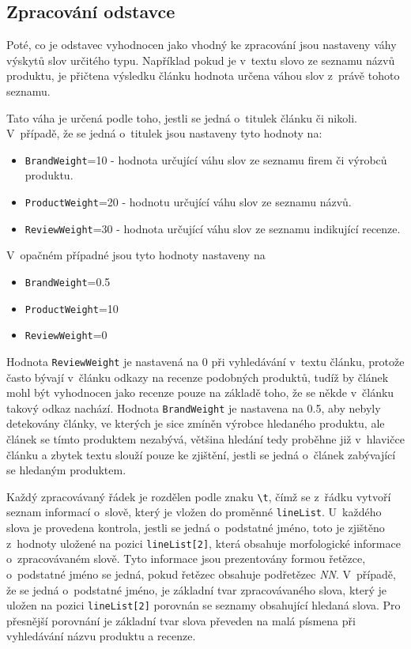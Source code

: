 \subsection*{Zpracování odstavce}
\label{zpracovani_odstavce}
Poté, co je odstavec vyhodnocen jako vhodný ke zpracování jsou nastaveny váhy výskytů slov určitého typu. Například pokud je v~textu slovo ze seznamu názvů produktu, je přičtena výsledku článku hodnota určena váhou slov z~právě tohoto seznamu.  

Tato váha je určená podle toho, jestli se jedná o~titulek článku či nikoli. V~případě, že se jedná o~titulek jsou nastaveny tyto hodnoty na:
\begin{itemize}
    \item \verb|BrandWeight|=10 - hodnota určující váhu slov ze seznamu firem či výrobců produktu.
    \item \verb|ProductWeight|=20 - hodnotu určující váhu slov ze seznamu názvů.
    \item \verb|ReviewWeight|=30 - hodnota určující váhu slov ze seznamu indikující recenze.
\end{itemize}
V~opačném případné jsou tyto hodnoty nastaveny na
\begin{itemize}
    \item \verb|BrandWeight|=0.5 
    \item \verb|ProductWeight|=10
    \item \verb|ReviewWeight|=0 
\end{itemize}
Hodnota \verb|ReviewWeight| je nastavená na 0 při vyhledávání v~textu článku, protože často bývají v~článku odkazy na recenze podobných produktů, tudíž by článek mohl být vyhodnocen jako recenze pouze na základě toho, že se někde v~článku takový odkaz nachází. Hodnota \verb|BrandWeight| je nastavena na 0.5, aby nebyly detekovány články, ve kterých je sice zmíněn výrobce hledaného produktu, ale článek se tímto produktem nezabývá, většina hledání tedy proběhne již v~hlavičce článku a zbytek textu slouží pouze ke zjištění, jestli se jedná o~článek zabývající se hledaným produktem. 

Každý zpracovávaný řádek je rozdělen podle znaku \verb|\t|, čímž se z~řádku vytvoří seznam informací o~slově, který je vložen do proměnné \verb|lineList|. U~každého slova je provedena kontrola, jestli se jedná o~podstatné jméno, toto je zjištěno z~hodnoty uložené na pozici \verb|lineList[2]|, která obsahuje morfologické informace o~zpracovávaném slově. Tyto informace jsou prezentovány formou řetězce, o~podstatné jméno se jedná, pokud řetězec obsahuje podřetězec \textit{NN}. 
V~případě, že se jedná o~podstatné jméno, je základní tvar zpracovávaného slova, který je uložen na pozici \verb|lineList[2]| porovnán se seznamy obsahující hledaná slova. Pro přesnější porovnání je základní tvar slova převeden na malá písmena při vyhledávání názvu produktu a recenze.

